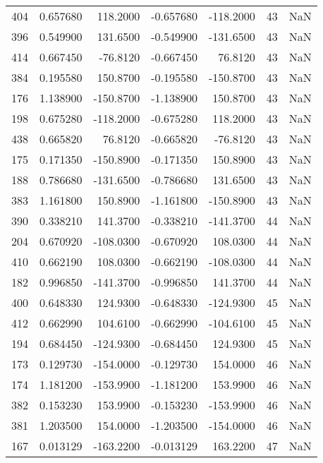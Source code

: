\begin{tabular}{rrrrrrr}
 404 &    0.657680 &  118.2000 &   -0.657680 &   -118.2000 &          43 & NaN \\
 396 &    0.549900 &  131.6500 &   -0.549900 &   -131.6500 &          43 & NaN \\
 414 &    0.667450 &  -76.8120 &   -0.667450 &     76.8120 &          43 & NaN \\
 384 &    0.195580 &  150.8700 &   -0.195580 &   -150.8700 &          43 & NaN \\
 176 &    1.138900 & -150.8700 &   -1.138900 &    150.8700 &          43 & NaN \\
 198 &    0.675280 & -118.2000 &   -0.675280 &    118.2000 &          43 & NaN \\
 438 &    0.665820 &   76.8120 &   -0.665820 &    -76.8120 &          43 & NaN \\
 175 &    0.171350 & -150.8900 &   -0.171350 &    150.8900 &          43 & NaN \\
 188 &    0.786680 & -131.6500 &   -0.786680 &    131.6500 &          43 & NaN \\
 383 &    1.161800 &  150.8900 &   -1.161800 &   -150.8900 &          43 & NaN \\
 390 &    0.338210 &  141.3700 &   -0.338210 &   -141.3700 &          44 & NaN \\
 204 &    0.670920 & -108.0300 &   -0.670920 &    108.0300 &          44 & NaN \\
 410 &    0.662190 &  108.0300 &   -0.662190 &   -108.0300 &          44 & NaN \\
 182 &    0.996850 & -141.3700 &   -0.996850 &    141.3700 &          44 & NaN \\
 400 &    0.648330 &  124.9300 &   -0.648330 &   -124.9300 &          45 & NaN \\
 412 &    0.662990 &  104.6100 &   -0.662990 &   -104.6100 &          45 & NaN \\
 194 &    0.684450 & -124.9300 &   -0.684450 &    124.9300 &          45 & NaN \\
 173 &    0.129730 & -154.0000 &   -0.129730 &    154.0000 &          46 & NaN \\
 174 &    1.181200 & -153.9900 &   -1.181200 &    153.9900 &          46 & NaN \\
 382 &    0.153230 &  153.9900 &   -0.153230 &   -153.9900 &          46 & NaN \\
 381 &    1.203500 &  154.0000 &   -1.203500 &   -154.0000 &          46 & NaN \\
 167 &    0.013129 & -163.2200 &   -0.013129 &    163.2200 &          47 & NaN \\

\end{tabular}
